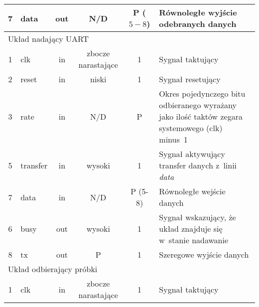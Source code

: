\begin{table}[h]
\begin{tabular}{|c|l|c|c|c|m{4.5cm}|}
7            & data           & out          & N/D                   & P ($5-8$)        & Równoległe wyjście odebranych danych                                                                                                               \\ \hline
\multicolumn{6}{|l|}{\cellcolor[HTML]{F8A102}Układ nadający UART} \\ \hline
1            & clk            & in           & zbocze narastające    & 1                & Sygnał taktujący                                                                                                                                   \\ \hline
2            & reset          & in           & niski                 & 1                & Sygnał resetujący                                                                                                                                  \\ \hline
3            & rate           & in           & N/D                   & P                & Okres pojedynczego bitu odbieranego wyrażany jako ilość taktów zegara systemowego (clk) minus~1                                                    \\ \hline
5            & transfer       & in           & wysoki                & 1                & Sygnał aktywujący transfer danych z~linii \textit{data}                                                                                            \\ \hline
7            & data           & in           & N/D                   & P (5-8)          & Równoległe wejście danych                                                                                                                          \\ \hline
6            & busy           & out          & wysoki                & 1                & Sygnał wskazujący, że układ znajduje się w~stanie nadawanie                                                                                        \\ \hline
8            & tx             & out          & P                     & 1                & Szeregowe wyjście danych                                                                                                                           \\ \hline 
\multicolumn{6}{|l|}{\cellcolor[HTML]{F8A102}Układ odbierający próbki} \\ \hline
1            & clk            & in           & zbocze narastające    & 1                & Sygnał taktujący                                                                                                                                   \\ \hline

\end{tabular}
\end{table}

